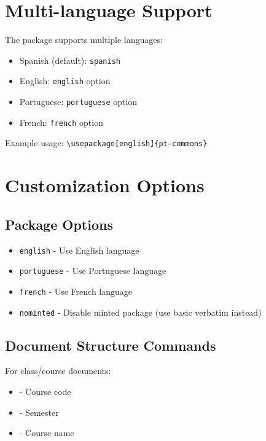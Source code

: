 \documentclass[11pt,letterpaper]{article}
\begin{document}
\section{Multi-language Support}

The package supports multiple languages:

\begin{itemize}
    \item Spanish (default): \texttt{spanish}
    \item English: \texttt{english} option
    \item Portuguese: \texttt{portuguese} option
    \item French: \texttt{french} option
\end{itemize}

Example usage: \texttt{\textbackslash usepackage[english]\{pt-commons\}}

\section{Customization Options}

\subsection{Package Options}

\begin{itemize}
    \item \texttt{english} - Use English language
    \item \texttt{portuguese} - Use Portuguese language
    \item \texttt{french} - Use French language
    \item \texttt{nominted} - Disable minted package (use basic verbatim instead)
\end{itemize}

\subsection{Document Structure Commands}

For class/course documents:
\begin{itemize}
    \item {} - Course code
    \item {} - Semester
    \item {} - Course name
\end{itemize}
\end{document}
